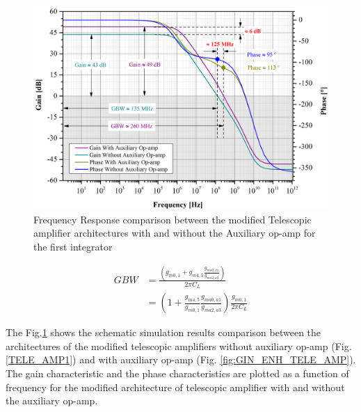 %
\begin{figure}[]
\centering
\includegraphics[width=\columnwidth]{Chap05/Figures/gain_gbw_comparison.png}
\caption{Frequency Response comparison between the modified Telescopic amplifier architectures with and without the Auxiliary op-amp for the first integrator}
\label{fig:gain_gbw_comparison}
\end{figure}
%
%
\begin{equation}
\begin{split}
        GBW &= \frac{\left(g_{m0,1}+g_{m4,5}\frac{g_{ma0,a1}}{g_{ma2,a3}}\right)}{2\pi C_L} \\
            &= \left(1+\frac{g_{m4,5}}{g_{m0,1}}\frac{g_{ma0,a1}}{g_{ma2,a3}}\right)\frac{g_{m0,1}}{2\pi C_L}
\end{split}
\end{equation}
%

The Fig.\ref{fig:gain_gbw_comparison} shows the schematic simulation results comparison between the architectures of the modified telescopic amplifiers without auxiliary op-amp (Fig. \ref{TELE_AMP1}) and with auxiliary op-amp (Fig. \ref{fig:GIN_ENH_TELE_AMP}). The gain characteristic and the phase characteristics are plotted as a function of frequency for the modified architecture of telescopic amplifier with and without the auxiliary op-amp. 

